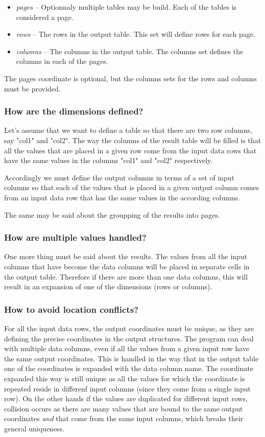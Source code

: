 \documentclass{report}
\begin{document}
\begin{itemize}
	\item \textit{pages} -- Optionnaly multiple tables may be build. Each
		of the tables is considered a page.
	\item \textit{rows} -- The rows in the output table. This set will define
		rows for each page.
	\item \textit{columns} -- The columns in the output table. The columns
		set defines the columns in each of the pages.
\end{itemize}

The pages coordinate is optional, but the columns sets for the rows and columns
must be provided.

\subsubsection{How are the dimensions defined?}
Let's assume that we want to define a table so that there are two row columns,
say "col1" and "col2". The way the columns of the result table will be filled
is that all the values that are placed in a given row come from the input data
rows that have the same values in the columns "col1" and "col2" respectively.

Accordingly we must define the output columns in terms of a set of input columns
so that each of the values that is placed in a given output column comes from
an input data row that has the same values in the according columns.

The same may be said about the groupping of the results into pages.

\subsubsection{How are multiple values handled?}
One more thing must be said about the results. The values from all the input
columns that have become the data columns will be placed in separate cells in the
output table. Therefore if there are more than one data columns, this will result
in an expansion of one of the dimensions (rows or columns).

\subsubsection{How to avoid location conflicts?}
For all the input data rows, the output coordinates must be unique, as they are
defining the precise coordinates in the output structures. The program can deal
with multiple data columns, even if all the values from a given input row have the
same output coordinates. This is handled in the way that in the output table one
of the coordinates is expanded with the data column name. The coordinate expanded
this way is still unique as all the values for which the coordinate is repeated
reside in differenf input columns (since they come from a single input row). On
the other hands if the values are duplicated for different input rows, collision
occurs as there are many values that are bound to the same output coordinates
\textit{and} that come from the same input columns, which breaks their general
uniqueness.
\end{document}
